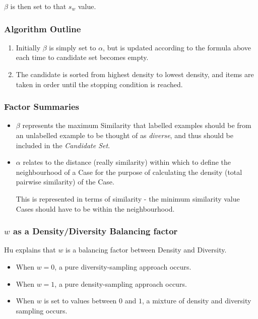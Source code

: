 \documentclass[a4paper,11pt]{report}
\begin{document}
$\beta$ is then set to that $s_{w}$ value.

\subsubsection{Algorithm Outline}
\begin{enumerate}
	\item Initially $\beta$ is simply set to $\alpha$, but is updated according to the formula above each time to candidate set becomes empty.
	\item The candidate is sorted from highest density to lowest density, and items are taken in order until the stopping condition is reached.
\end{enumerate}

\subsubsection{Factor Summaries}
\begin{itemize}
	\item $\beta$ represents the maximum Similarity that labelled examples should be from an unlabelled example to be thought of as \emph{diverse}, and thus should be included in the \emph{Candidate Set}.

	\item $\alpha$ relates to the distance (really similarity) within which to define the neighbourhood of a Case for the purpose of calculating the density (total pairwise similarity) of the Case. 
	
	This is represented in terms of similarity - the minimum similarity value Cases should have to be within the neighbourhood.
	
\end{itemize}

\subsubsection{$w$ as a Density/Diversity Balancing factor}
Hu explains that $w$ is a balancing factor between Density and Diversity\cite{Hu2010}. 

\begin{itemize}
	\item When $w=0$, a pure diversity-sampling approach occurs. 
	\item When $w=1$, a pure density-sampling approach occurs. 
	\item When $w$ is set to values between $0$ and $1$, a mixture of density and diversity sampling occurs.
\end{itemize}
\end{document}
